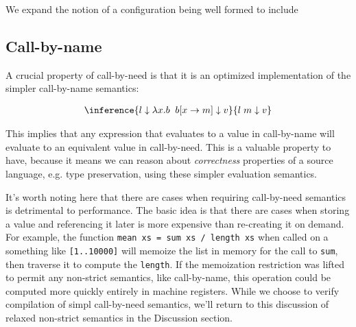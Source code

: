 We expand the notion of a configuration being well formed to include  

\subsection{Call-by-name}
A crucial property of call-by-need is that it is an optimized implementation of
the simpler call-by-name semantics: 

\begin{align}
\inference{l \downarrow \lambda x. b \; \;  b [x \rightarrow m] \downarrow v}{l \; m \downarrow v}
\end{align}

This implies that any expression that evaluates to a value in call-by-name will
evaluate to an equivalent value in call-by-need. This is a valuable property to
have, because it means we can reason about \emph{correctness} properties of a
source language, e.g. type preservation, using these simpler evaluation
semantics. 

It's worth noting here that there are cases when requiring call-by-need
semantics is detrimental to performance. The basic idea is that there are cases
when storing a value and referencing it later is more expensive than re-creating
it on demand. For example, the function \texttt{mean xs = sum xs / length xs}
when called on a something like \texttt{[1..10000]} will memoize the list in
memory for the call to \texttt{sum}, then traverse it to compute the
\texttt{length}.  If the memoization restriction was lifted to permit any
non-strict semantics, like call-by-name, this operation could be computed more
quickly entirely in machine registers. While we choose to verify compilation of
simpl call-by-need semantics, we'll return to this discussion of relaxed
non-strict semantics in the Discussion section.

